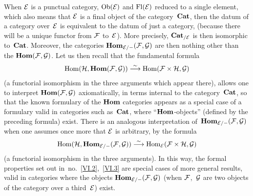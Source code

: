 \begin{remarks}
When
$\cal{E}$ is a punctual category,
\ie $\Ob(\cal{E})$ and $\Fl(\cal{E})$ reduced to a single
element, which also means that $\cal{E}$ is a
final object of the category~$\Cat$, then the datum of a
category over~$\cal{E}$ is equivalent to the datum
of just a category, (because there will be a unique functor from
$\cal{F}$ to~$\cal{E}$). More precisely,
$\Cat_{/\cal{E}}$ is then isomorphic to~$\Cat$. Moreover, the
categories $\SheafHom_{\cal{E}/-}(\cal{F},\cal{G})$ are then nothing
other than the $\SheafHom(\cal{F},\cal{G})$. Let us then recall that the
fundamental formula
$$
\Hom(\cal{H},\SheafHom(\cal{F},\cal{G}))\isomto
\Hom(\cal{F}\times\cal{H},\cal{G})
$$
(a functorial isomorphism in the three arguments which appear there),
allows one to interpret $\SheafHom(\cal{F},\cal{G})$ axiomatically,
in terms internal to the category~$\Cat$, so that the
known formulary of the $\SheafHom$ categories appears as a
special case of a formulary valid in categories such
as~$\Cat$, where ``$\SheafHom$-objects'' (defined by the
preceding formula) exist. There is an analogous
interpretation of~$\SheafHom_{\cal{E}/-}(\cal{F},\cal{G})$ when one assumes
once more that $\cal{E}$ is arbitrary, by the formula
$$
\Hom(\cal{H},\SheafHom_{\cal{E}/-}(\cal{F},\cal{G}))\isomto
\Hom_{\cal{E}}(\cal{F}\times\cal{H},\cal{G})
$$
(a functorial isomorphism in the three arguments). In this way,
the formal properties set out in~no.~\ref{VI.2},~\ref{VI.3} are
special cases of more general results, valid
in categories where the objects
$\SheafHom_{\cal{E}/-}(\cal{F},\cal{G})$ (when $\cal{F}$,~$\cal{G}$
are two objects of the category over a third~$\cal{E}$) exist.
\end{remarks}

